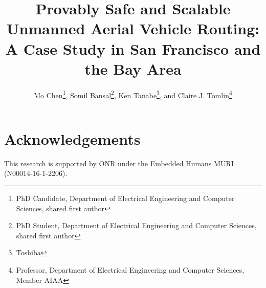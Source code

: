 \documentclass[submit]{aiaa-pretty}
\title{\LARGE \bf Provably Safe and Scalable Unmanned Aerial Vehicle Routing: A Case Study in San Francisco and the Bay Area}
\author{Mo Chen\thanks{PhD Candidate, Department of Electrical Engineering and Computer Sciences, shared first author}, Somil Bansal\thanks{PhD Student, Department of Electrical Engineering and Computer Sciences, shared first author}, Ken Tanabe\thanks{Toshiba}, and Claire J. Tomlin\thanks{Professor, Department of Electrical Engineering and Computer Sciences, Member AIAA}
}
\begin{document}
\maketitle





















\section*{Acknowledgements}
This research is supported by ONR under the Embedded Humans MURI (N00014-16-1-2206).




\end{document}
